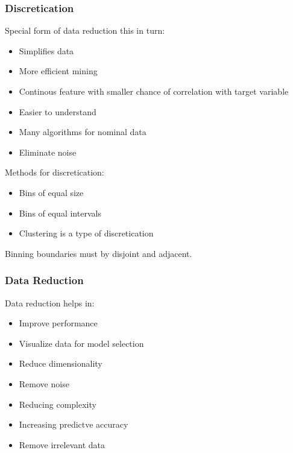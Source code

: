 \documentclass[../Main.tex]{subfiles}
\begin{document}
\subsubsection{Discretication}
Special form of data reduction this in turn:
\begin{itemize}
    \item Simplifies data
    \item More efficient mining
    \item Continous feature with smaller chance of correlation with target variable
    \item Easier to understand
    \item Many algorithms for nominal data
    \item Eliminate noise
\end{itemize}
Methods for discretication:
\begin{itemize}
    \item Bins of equal size
    \item Bins of equal intervals
    \item Clustering is a type of discretication
\end{itemize}
Binning boundaries must by disjoint and adjacent.

\subsubsection{Data Reduction}
Data reduction helps in:
\begin{itemize}
    \item Improve performance
    \item Visualize data for model selection
    \item Reduce dimensionality
    \item Remove noise
    \item Reducing complexity
    \item Increasing predictve accuracy
    \item Remove irrelevant data
\end{itemize}
\end{document}
